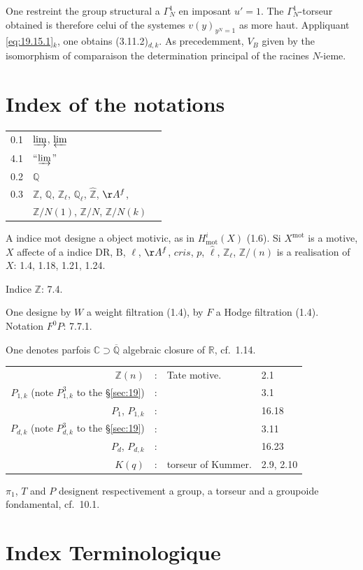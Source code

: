 \documentclass[12pt,a4paper]{article}
\theoremstyle{plain}
\theoremstyle{definition}
\theoremstyle{remark}
\newcommand{\mot}{\mathrm{mot}}
\newcommand{\Betti}{B}
\newcommand{\cris}{cris}
\newcommand{\ZZ}{\mathbb{Z}}
\newcommand{\QQ}{\mathbb{Q}}
\newcommand{\CC}{\mathbb{C}}
\newcommand{\RR}{\mathbb{R}}
\begin{document}
One restreint the group structural a $\Gamma_N^1$ en imposant
$u' = 1$. The $\Gamma_N^1$-torseur obtained is therefore celui of the systemes
$v(y)_{y^N=1}$ as more haut. Appliquant
\eqref{eq:19.15.1}$_k$, one obtains (3.11.2)$_{d,k}$. As
precedemment, $V_\Betti$ given by the isomorphism of comparaison the
determination principal of the racines $N$-ieme.


\newpage
\section*{Index of the notations}

\begin{tabular}{rll}
0.1 & $\varinjlim$, $\varprojlim$ & \\
4.1 & ``$\varinjlim$'' & \\
0.2 & $\QQ$ & \\
0.3 & $\ZZ$, $\QQ$, $\ZZ_\ell$, $\QQ_\ell$, $\hat{\ZZ}$, $\AA^f$, & \\
& $\ZZ/N(1)$, $\ZZ/N$, $\ZZ/N(k)$ & \\
\end{tabular}

A indice mot designe a object motivic, as in $H^i_\mot(X)$
(1.6). Si $X^\mot$ is a motive, $X$ affecte of a indice DR, B,
$\ell$, $\AA^f$, $\cris$, $p$, $\hat{\ell}$, $\ZZ_\ell$, $\ZZ/(n)$ is
a realisation of $X$: 1.4, 1.18, 1.21, 1.24.

Indice $\ZZ$: 7.4.

One designe by $W$ a weight filtration (1.4), by $F$ a
Hodge filtration (1.4). Notation $F^0P$: 7.7.1.

One denotes parfois $\CC \supset \overline{\QQ}$ algebraic closure of
$\RR$, cf.\ 1.14.

\begin{tabular}{rlll}
$\ZZ(n)$ &:& Tate motive. & 2.1 \\
$P_{1,k}$ (note $P^3_{1,k}$ to the \S\ref{sec:19}) &:& & 3.1 \\
$P_1$, $P_{1,k}$ &:& & 16.18 \\
$P_{d,k}$ (note $P^3_{d,k}$ to the \S\ref{sec:19}) &:& & 3.11 \\
$P_d$, $P_{d,k}$ &:& & 16.23 \\
$K(q)$ &:& torseur of Kummer. & 2.9, 2.10
\end{tabular}

$\pi_1$, $T$ and $P$ designent respectivement a group, a torseur and
a groupoide fondamental, cf.\ 10.1.

\newpage
\section*{Index Terminologique}
\end{document}
